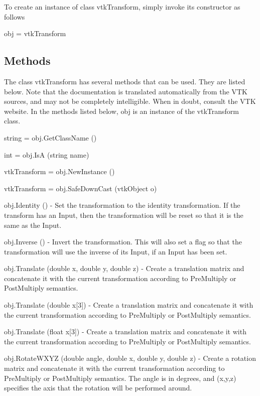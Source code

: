 To create an instance of class vtk\-Transform, simply invoke its constructor as follows \begin{DoxyVerb}  obj = vtkTransform
\end{DoxyVerb}
 \hypertarget{vtkwidgets_vtkxyplotwidget_Methods}{}\subsection{Methods}\label{vtkwidgets_vtkxyplotwidget_Methods}
The class vtk\-Transform has several methods that can be used. They are listed below. Note that the documentation is translated automatically from the V\-T\-K sources, and may not be completely intelligible. When in doubt, consult the V\-T\-K website. In the methods listed below, {\ttfamily obj} is an instance of the vtk\-Transform class. 
\begin{DoxyItemize}
\item {\ttfamily string = obj.\-Get\-Class\-Name ()}  
\item {\ttfamily int = obj.\-Is\-A (string name)}  
\item {\ttfamily vtk\-Transform = obj.\-New\-Instance ()}  
\item {\ttfamily vtk\-Transform = obj.\-Safe\-Down\-Cast (vtk\-Object o)}  
\item {\ttfamily obj.\-Identity ()} -\/ Set the transformation to the identity transformation. If the transform has an Input, then the transformation will be reset so that it is the same as the Input.  
\item {\ttfamily obj.\-Inverse ()} -\/ Invert the transformation. This will also set a flag so that the transformation will use the inverse of its Input, if an Input has been set.  
\item {\ttfamily obj.\-Translate (double x, double y, double z)} -\/ Create a translation matrix and concatenate it with the current transformation according to Pre\-Multiply or Post\-Multiply semantics.  
\item {\ttfamily obj.\-Translate (double x\mbox{[}3\mbox{]})} -\/ Create a translation matrix and concatenate it with the current transformation according to Pre\-Multiply or Post\-Multiply semantics.  
\item {\ttfamily obj.\-Translate (float x\mbox{[}3\mbox{]})} -\/ Create a translation matrix and concatenate it with the current transformation according to Pre\-Multiply or Post\-Multiply semantics.  
\item {\ttfamily obj.\-Rotate\-W\-X\-Y\-Z (double angle, double x, double y, double z)} -\/ Create a rotation matrix and concatenate it with the current transformation according to Pre\-Multiply or Post\-Multiply semantics. The angle is in degrees, and (x,y,z) specifies the axis that the rotation will be performed around.  

\end{DoxyItemize}

